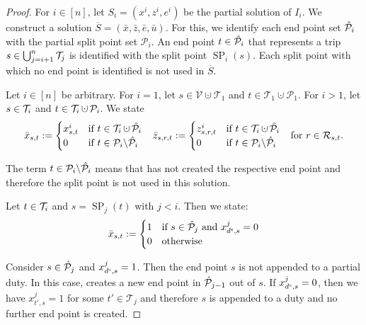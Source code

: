 \begin{proof}

For ${i\in[n]}$, let ${S_i=\left(x^i,z^i,e^i\right)}$ be the partial solution of $I_i$. We construct a solution ${\overline{S}=\left(\bar{x},\bar{z},\bar{e},\bar{u}\right)}$. For this, we identify each end point set $\hat{\mathcal{P}}_i$ with the partial split point set $\mathcal{P}_i$. An end point ${t\in\hat{\mathcal{P}}_i}$ that represents a trip ${s\in\bigcup_{j=i+1}^n \mathcal{T}_j}$ is identified with the split point $\operatorname{SP}_i(s)$. Each split point with which no end point is identified is not used in $\overline{S}$.

Let ${i\in[n]}$ be arbitrary. For ${i=1}$, let ${s\in\mathcal{V}\cupdot\mathcal{T}_1}$ and ${t\in\mathcal{T}_1\cupdot\mathcal{P}_1}$. For ${i>1}$, let ${s\in\mathcal{T}_i}$ and ${t\in\Ti\cupdot\mathcal{P}_i}$. We state
\begin{align*}
	\bar{x}_{s,t} := \begin{cases} x^i_{s,t} & \text{if } t\in\Ti\cupdot\Phat_i \\ 0 & \text{if } t\in\mathcal{P}_i\backslash\Phat_i \end{cases} &&
	\bar{z}_{s,r,t} := \begin{cases} z^i_{s,r,t} & \text{if } t\in\Ti\cupdot\Phat_i \\ 0 & \text{if } t\in\mathcal{P}_i\backslash\Phat_i \end{cases} &&
	\text{for } r\in\Rst.
\end{align*}

The term ${t\in\mathcal{P}_i\backslash\hat{\mathcal{P}}_i}$ means that  has not created the respective end point and therefore the split point is not used in this solution.

Let ${t\in\mathcal{T}_i}$ and ${s=\operatorname{SP}_j(t)}$ with ${j<i}$. Then we state:
\begin{align}
	\bar{x}_{s,t} := \begin{cases} 1 & \text{if } s\in\hat{\mathcal{P}}_j \text{ and } x^j_{d^{\operatorname{s}},s} = 0 \\ 0 & \text{otherwise} \end{cases} \label{eq:proof1}
\end{align}

Consider ${s\in\hat{\mathcal{P}}_j}$ and ${x^j_{d^{\operatorname{s}},s}=1}$. Then the end point $s$ is not appended to a partial duty. In this case,  creates a new end point in $\hat{\mathcal{P}}_{j-1}$ out of $s$. If ${x^j_{d^{\operatorname{s}},s}=0}$, then we have ${x^j_{t',s}=1}$ for some ${t'\in\mathcal{T}_j}$ and therefore $s$ is appended to a duty and no further end point is created.


\end{proof}
